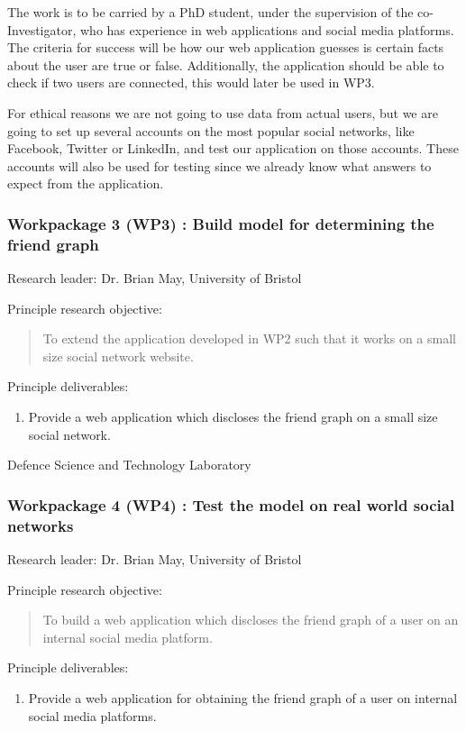 \documentclass[a4paper,11pt]{article}
\begin{document}
The work is to be carried by a PhD student, under the supervision of the co-Investigator, who has experience in web applications and social media platforms. The criteria for success will be how  our web application guesses is certain facts about the user are true or false. Additionally, the application should be able to check if two users are connected, this would later be used in WP3. 

For ethical reasons we are not going to use data from actual users, but we are going to set up several accounts on the most popular social networks, like Facebook, Twitter or LinkedIn, and test our application on those accounts. These accounts will also be used for testing since we already know what answers to expect from the application.

\subsubsection*{Workpackage 3 (WP3) : Build model for determining the friend graph}
Research leader: Dr. Brian May, University of Bristol

Principle research objective:
\begin{quote}
	To extend the application developed in WP2 such that it works on a small size social network website.
\end{quote}

Principle deliverables:
\begin{enumerate}
\item Provide a web application which discloses the friend graph on a small size social network.
\end{enumerate}


Defence Science and Technology Laboratory

\subsubsection*{Workpackage 4 (WP4) : Test the model on real world social networks}
Research leader: Dr. Brian May, University of Bristol

Principle research objective:
\begin{quote}
	To build a web application which discloses the friend graph of a user on an internal social media platform.
\end{quote}

Principle deliverables:
\begin{enumerate}
\item Provide a web application for obtaining the friend graph of a user on internal social media platforms.
\end{enumerate}
\end{document}

